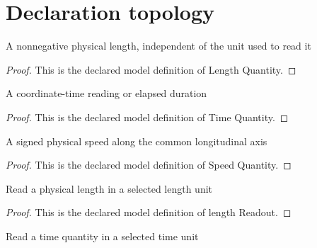 \section{Declaration topology}
\begin{definition}
  \label{def:physics:phyx-mini-0568:phyxminiproblems-problemphyxmini0568-lengthquantity}
  A nonnegative physical length, independent of the unit used to read it
\end{definition}
\begin{proof}
  This is the declared model definition of Length Quantity.
\end{proof}
\begin{definition}
  \label{def:physics:phyx-mini-0568:phyxminiproblems-problemphyxmini0568-timequantity}
  A coordinate-time reading or elapsed duration
\end{definition}
\begin{proof}
  This is the declared model definition of Time Quantity.
\end{proof}
\begin{definition}
  \label{def:physics:phyx-mini-0568:phyxminiproblems-problemphyxmini0568-speedquantity}
  A signed physical speed along the common longitudinal axis
\end{definition}
\begin{proof}
  This is the declared model definition of Speed Quantity.
\end{proof}
\begin{definition}
  \label{def:physics:phyx-mini-0568:phyxminiproblems-problemphyxmini0568-lengthreadout}
  Read a physical length in a selected length unit
\end{definition}
\begin{proof}
  This is the declared model definition of length Readout.
\end{proof}
\begin{definition}
  \label{def:physics:phyx-mini-0568:phyxminiproblems-problemphyxmini0568-timereadout}
  Read a time quantity in a selected time unit
\end{definition}
